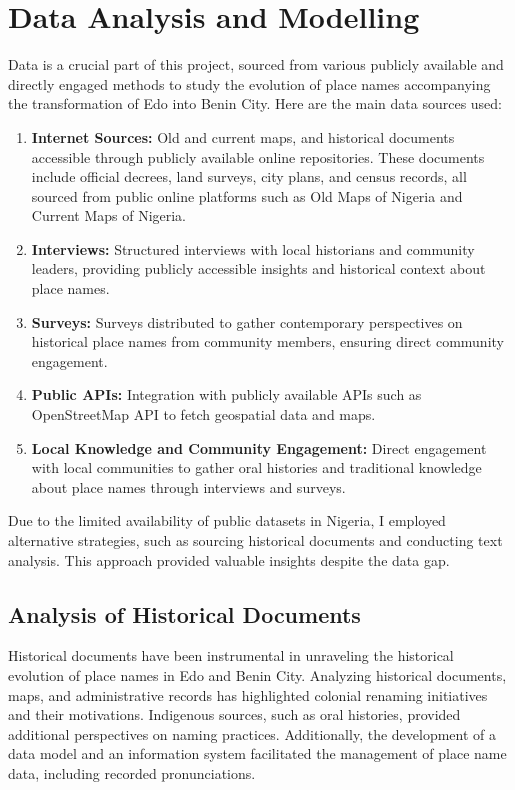 \chapter{Data Analysis and Modelling}

Data is a crucial part of this project, sourced from various publicly available and directly engaged methods to study the evolution of place names accompanying the transformation of Edo into Benin City. Here are the main data sources used:

\begin{enumerate}[label=\arabic*.]
    \item \textbf{Internet Sources:} Old and current maps, and historical documents accessible through publicly available online repositories. These documents include official decrees, land surveys, city plans, and census records, all sourced from public online platforms such as Old Maps of Nigeria and Current Maps of Nigeria.
    \item \textbf{Interviews:} Structured interviews with local historians and community leaders, providing publicly accessible insights and historical context about place names.
    \item \textbf{Surveys:} Surveys distributed to gather contemporary perspectives on historical place names from community members, ensuring direct community engagement.
    \item \textbf{Public APIs:} Integration with publicly available APIs such as OpenStreetMap API to fetch geospatial data and maps.
    \item \textbf{Local Knowledge and Community Engagement:} Direct engagement with local communities to gather oral histories and traditional knowledge about place names through interviews and surveys.
\end{enumerate}

Due to the limited availability of public datasets in Nigeria, I employed alternative strategies, such as sourcing historical documents and conducting text analysis. This approach provided valuable insights despite the data gap.
\section{Analysis of Historical Documents}
Historical documents have been instrumental in unraveling the historical evolution of place names in Edo and Benin City. Analyzing historical documents, maps, and administrative records has highlighted colonial renaming initiatives and their motivations. Indigenous sources, such as oral histories, provided additional perspectives on naming practices. Additionally, the development of a data model and an information system facilitated the management of place name data, including recorded pronunciations.

